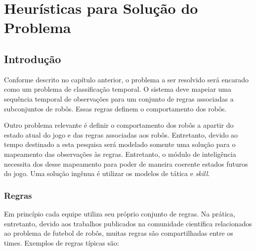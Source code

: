 \chapter{Heurísticas para Solução do Problema}\label{cap:heuristicas}

\section{Introdução}

Conforme descrito no capítulo anterior, o problema a ser resolvido será
encarado como um problema de classificação temporal. O sistema deve mapeiar uma
sequência temporal de observações para um conjunto de regras associadas a
subconjuntos de robôs. Essas regras definem o comportamento dos robôs.

Outro problema relevante é definir o comportamento dos robôs a apartir do estado
atual do jogo e das regras associadas aos robôs. Entretanto, devido ao tempo
destinado a esta pesquisa será modelado somente uma solução para o mapeamento das
observações às regras. Entretanto, o módulo de inteligência necessita dos desse
mapeamento para poder de maneira coerente estados futuros do jogo. Uma solução
ingênua é utilizar os modelos de tática e \textit{skill}.

\subsection{Regras}

Em princípio cada
equipe utiliza seu próprio conjunto de regras. Na prática, entretanto, devido
aos trabalhos publicados na comunidade científica relacionados ao problema de
futebol de robôs, muitas regras são compartilhadas entre os times. Exemplos
de regras típicas são:


